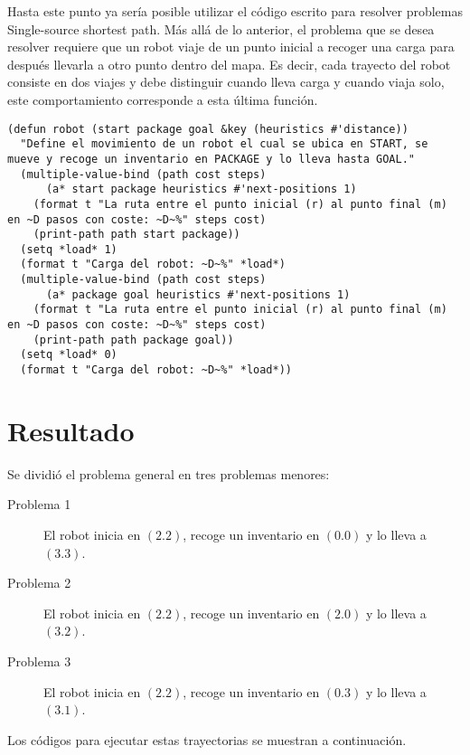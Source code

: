 \documentclass[a4paper,12pt]{article}
\begin{document}
Hasta este punto ya sería posible utilizar el código escrito para resolver problemas Single-source shortest path. Más allá de lo anterior, el problema que se desea resolver requiere que un robot viaje de un punto inicial a recoger una carga para después llevarla a otro punto dentro del mapa. Es decir, cada trayecto del robot consiste en dos viajes y debe distinguir cuando lleva carga y cuando viaja solo, este comportamiento corresponde a esta última función.

\lstset{language=Lisp,label= ,caption= ,captionpos=b,numbers=none,numbers=left}
\begin{lstlisting}
(defun robot (start package goal &key (heuristics #'distance))
  "Define el movimiento de un robot el cual se ubica en START, se mueve y recoge un inventario en PACKAGE y lo lleva hasta GOAL."
  (multiple-value-bind (path cost steps)
      (a* start package heuristics #'next-positions 1)
    (format t "La ruta entre el punto inicial (r) al punto final (m) en ~D pasos con coste: ~D~%" steps cost)
    (print-path path start package))
  (setq *load* 1)
  (format t "Carga del robot: ~D~%" *load*)
  (multiple-value-bind (path cost steps)
      (a* package goal heuristics #'next-positions 1)
    (format t "La ruta entre el punto inicial (r) al punto final (m) en ~D pasos con coste: ~D~%" steps cost)
    (print-path path package goal))
  (setq *load* 0)
  (format t "Carga del robot: ~D~%" *load*))
\end{lstlisting}

\section*{Resultado}
\label{sec:orgbc0d202}

Se dividió el problema general en tres problemas menores:

\begin{description}
\item[{Problema 1}] El robot inicia en \((2 . 2)\), recoge un inventario en \((0 . 0)\) y lo lleva a \((3 .3)\).
\item[{Problema 2}] El robot inicia en \((2 . 2)\), recoge un inventario en \((2 . 0)\) y lo lleva a \((3 .2)\).
\item[{Problema 3}] El robot inicia en \((2 . 2)\), recoge un inventario en \((0 . 3)\) y lo lleva a \((3 .1)\).
\end{description}

Los códigos para ejecutar estas trayectorias se muestran a continuación.
\end{document}
